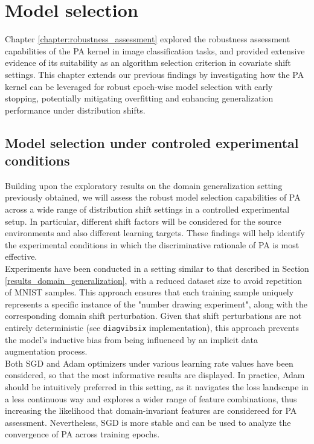 \chapter{Model selection}\label{chapter:model_selection}

Chapter \ref{chapter:robustness_assessment} explored the robustness assessment
capabilities of the PA kernel in image classification tasks, and provided extensive 
evidence of its suitability as an algorithm selection criterion in covariate shift settings. 
This chapter extends our previous findings by investigating 
how the PA kernel can be leveraged for robust epoch-wise model selection
with early stopping, potentially mitigating overfitting and enhancing
generalization performance under distribution shifts.

\section{Model selection under controled experimental conditions}

Building upon the exploratory results on the domain generalization setting previously obtained, 
we will assess the robust model selection capabilities of PA across a
wide range of distribution shift settings in a controlled experimental setup. In particular,
different shift factors will be considered for the source environments and also different learning
targets. These findings will help identify the experimental conditions in which the 
discriminative rationale of PA is most effective. \\

Experiments have been conducted in a setting similar to that described in Section 
\ref{results_domain_generalization}, with a reduced dataset size to avoid repetition of MNIST 
samples. This approach ensures that each training sample uniquely represents a specific instance 
of the "number drawing experiment", along with the corresponding domain 
shift perturbation. Given that shift perturbations are not entirely deterministic 
(see \texttt{diagvibsix} implementation), this approach prevents the model's inductive bias 
from being influenced by an implicit data augmentation process. \\

Both SGD and Adam optimizers under various learning rate values have been considered, 
so that the most informative results are displayed. In practice, Adam should be intuitively preferred
in this setting, as it navigates the loss landscape in a less continuous way and
explores a wider range of feature combinations, thus increasing the likelihood that domain-invariant
features are considereed for PA assessment. Nevertheless, SGD is more stable and can be used to
analyze the convergence of PA across training epochs. \\

